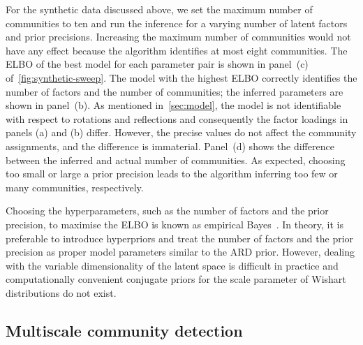 \documentclass[onecolumn,pre,superscriptaddress, longbibliography, nofootinbib, notitlepage]{revtex4-1}
\begin{document}
 For the synthetic data discussed above, we set the maximum number of communities to ten and run the inference for a varying number of latent factors and prior precisions. Increasing the maximum number of communities would not have any effect because the algorithm identifies at most eight communities. 
The ELBO of the best model for each parameter pair is shown in panel~(c) of~\cref{fig:synthetic-sweep}. 
The model with the highest ELBO correctly identifies the number of factors and the number of communities; the inferred parameters are shown in panel~(b). As mentioned in~\cref{sec:model}, the model is not identifiable with respect to rotations and reflections and consequently the factor loadings in panels (a) and (b) differ. However, the precise values do not affect the community assignments, and the difference is immaterial. 
Panel~(d) shows the difference between the inferred and actual number of communities. As expected, choosing too small or large a prior precision leads to the algorithm inferring too few or many communities, respectively.

Choosing the hyperparameters, such as the number of factors and the prior precision, to maximise the ELBO is known as empirical Bayes~\cite{Bishop2007}. In theory, it is preferable to introduce hyperpriors and treat the number of factors and the prior precision as proper model parameters similar to the ARD prior. However, dealing with the variable dimensionality of the latent space is difficult in practice and computationally convenient conjugate priors for the scale parameter of Wishart distributions do not exist.

\subsection{Multiscale community detection}
\end{document}
